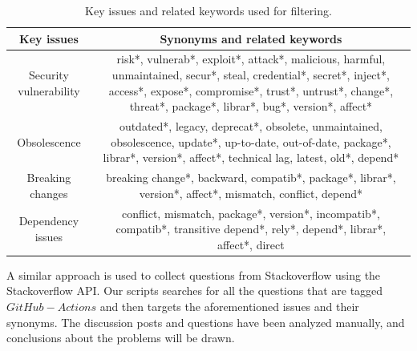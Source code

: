 \documentclass[conference]{IEEEtran}
\begin{document}
  \begin{table}[H]
          \centering
          \caption{Key issues and related keywords used for filtering.}
          \label{tab:related_keywords}
	\hspace{5cm}
          \begin{tabular}{|c|c|}
              \hline
              \textbf{Key issues} & \textbf{Synonyms and related keywords} \\
              \hline
              Security vulnerability & \parbox[t]{5.5cm}{risk*, vulnerab*, exploit*, attack*, malicious, harmful, unmaintained, secur*, steal, credential*, secret*, inject*, access*, expose*, compromise*, trust*, untrust*, change*, threat*, package*, librar*, bug*,  version*, affect*\\}  \\
             \hline
             Obsolescence & \parbox[t]{5.5cm}{outdated*, legacy, deprecat*, obsolete, unmaintained, obsolescence, update*, up-to-date, out-of-date, package*, librar*, version*, affect*, technical lag, latest, old*, depend*\\}  \\
              \hline
              Breaking changes & \parbox[t]{5.5cm}{breaking change*,  backward, compatib*, package*, librar*, version*, affect*, mismatch, conflict, depend*\\} \\
              \hline
              Dependency issues &  \parbox[t]{5.5cm}{conflict, mismatch, package*, version*, incompatib*, compatib*, transitive depend*, rely*, depend*, librar*, affect*, direct\\}  \\
              \hline
          \end{tabular}
\end{table}
                A similar approach is used to collect questions from Stackoverflow using the Stackoverflow API. Our scripts searches for all the questions that are tagged $GitHub-Actions$ and then targets the aforementioned issues and their synonyms. The discussion posts and questions have been analyzed manually, and conclusions about the problems will be drawn.\\
\end{document}
